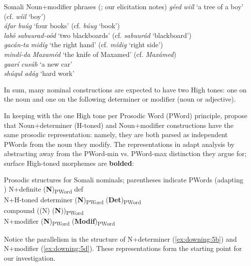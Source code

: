 \documentclass[output=paper]{langscibook}
\begin{document}
\ea  Somali Noun+modifier phrases (\citealt{Hyman1981,Green2016}; our elicitation notes)  \label{ex:downing:4}
  \ea \textit{géed} \textit{wiíl}  ‘a tree of a boy’  (cf. \textit{wíil} ‘boy’) \label{ex:downing:4a}\\
  \ex \textit{áfar} \textit{buúg}  ‘four books’  (cf. \textit{búug} ‘book’)\label{ex:downing:4b}\\
  \ex \textit{labó} \textit{sabuurad-oód}  ‘two blackboards’  (cf. \textit{sabuurád} ‘blackboard’)\label{ex:downing:4c}\\
  \ex \textit{gacán-ta} \textit{midíg}  ‘the right hand’  (cf. \textit{mídig} ‘right side’)\label{ex:downing:4d}\\
  \ex \textit{mindí-da} \textit{Maxaméd}  ‘the knife of Maxamed’  (cf. \textit{Maxámed})\label{ex:downing:4e}\\
  \ex \textit{gaarí} \textit{cusúb}  ‘a new car’\label{ex:downing:4f}\\
  \ex \textit{shúqul} \textit{adág}  ‘hard work’\label{ex:downing:4g}\\
  \z
\z
 
In sum, many nominal constructions are expected to have two High tones: one on the noun and one on the following determiner or modifier (noun or adjective).

In keeping with the one High tone per Prosodic Word (PWord) principle, \citet{Green2016} propose that Noun+determiner (H-toned) and Noun+modifier constructions have the same prosodic representation: namely, they are both parsed as independent PWords from the noun they modify. The representations in  adapt  analysis by abstracting away from the PWord-min vs. PWord-max distinction they argue for; surface High-toned morphemes are \textbf{bolded}:


\ea  Prosodic structures for Somali nominals; parentheses indicate PWords (adapting \citealt{Green2016})  \label{ex:downing:5}
\ea  N+definite  (\textbf{N})\textsubscript{PWord} def\label{ex:downing:5a}\\
\ex  N+H-toned determiner  (\textbf{N})\textsubscript{PWord} (\textbf{Det})\textsubscript{PWord}\label{ex:downing:5b}\\
\ex  compound  ((N) (\textbf{N}))\textsubscript{PWord}\label{ex:downing:5c}\\
\ex  N+modifier  (\textbf{N})\textsubscript{PWord} (\textbf{Modif})\textsubscript{PWord}\label{ex:downing:5d}\\
\z
\z

Notice the parallelism in the structure of N+determiner (\ref{ex:downing:5b}) and N+modifier (\ref{ex:downing:5d}). These representations form the starting point for our investigation.
\end{document}
